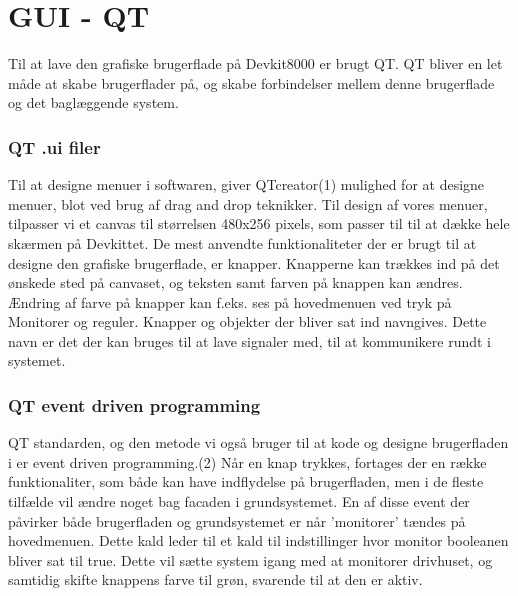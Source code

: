 \section{GUI - QT }
Til at lave den grafiske brugerflade på Devkit8000 er brugt QT. QT bliver en let måde at skabe brugerflader på, og skabe forbindelser mellem denne brugerflade og det baglæggende system. 


\subsubsection{ QT .ui filer}
Til at designe menuer i softwaren, giver QTcreator(1) mulighed for at designe menuer, blot ved brug af drag and drop teknikker. Til design af vores menuer, tilpasser vi et canvas til størrelsen 480x256 pixels, som passer til til at dække hele skærmen på Devkittet. De mest anvendte funktionaliteter der er brugt til at designe den grafiske brugerflade, er knapper. Knapperne kan trækkes ind på det ønskede sted på canvaset, og teksten samt farven på knappen kan ændres. Ændring af farve på knapper kan f.eks. ses på hovedmenuen ved tryk på Monitorer og reguler. Knapper og objekter der bliver sat ind navngives. Dette navn er det der kan bruges til at lave signaler med, til at kommunikere rundt i systemet.

\subsubsection{QT event driven programming}
QT standarden, og den metode vi også bruger til at kode og designe brugerfladen i er event driven programming.(2) Når en knap trykkes, fortages der en række funktionaliter, som både kan have indflydelse på brugerfladen, men i de fleste tilfælde vil ændre noget bag facaden i grundsystemet.
En af disse event der påvirker både brugerfladen og grundsystemet er når 'monitorer' tændes på hovedmenuen. Dette kald leder til et kald til indstillinger hvor monitor booleanen bliver sat til true. Dette vil sætte system igang med at monitorer drivhuset, og samtidig skifte knappens farve til grøn, svarende til at den er aktiv.

